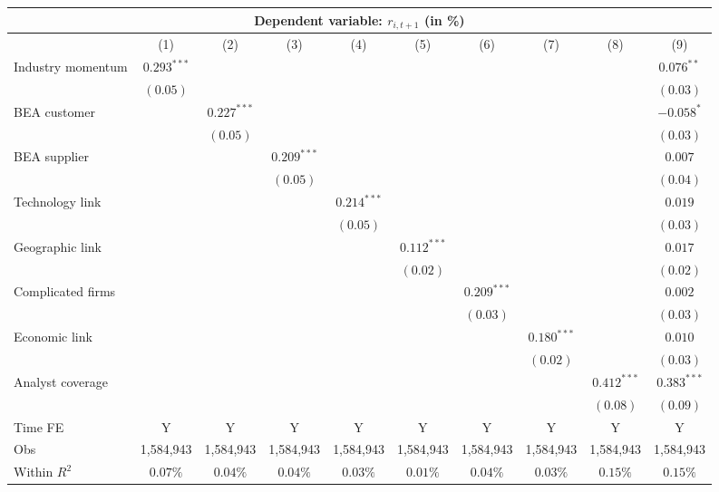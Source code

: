 \begin{tabular}{lccccccccc}
   \toprule
                        \multicolumn{10}{c}{Dependent variable: $r_{i,t+1}$ (in \%)} \\
 \hline \vspace{5pt} & (1) & (2) & (3) & (4) & (5) & (6) & (7) & (8) & (9) \\ 
  Industry momentum & $0.293^{***}$ &  &  &  &  &  &  &  & $0.076^{**}$ \\ 
   & $(0.05)$ &  &  &  &  &  &  &  & $(0.03)$ \\ 
  BEA customer &  & $0.227^{***}$ &  &  &  &  &  &  & $-0.058^{*}$ \\ 
   &  & $(0.05)$ &  &  &  &  &  &  & $(0.03)$ \\ 
  BEA supplier &  &  & $0.209^{***}$ &  &  &  &  &  & $0.007$ \\ 
   &  &  & $(0.05)$ &  &  &  &  &  & $(0.04)$ \\ 
  Technology link &  &  &  & $0.214^{***}$ &  &  &  &  & $0.019$ \\ 
   &  &  &  & $(0.05)$ &  &  &  &  & $(0.03)$ \\ 
  Geographic link &  &  &  &  & $0.112^{***}$ &  &  &  & $0.017$ \\ 
   &  &  &  &  & $(0.02)$ &  &  &  & $(0.02)$ \\ 
  Complicated firms &  &  &  &  &  & $0.209^{***}$ &  &  & $0.002$ \\ 
   &  &  &  &  &  & $(0.03)$ &  &  & $(0.03)$ \\ 
  Economic link &  &  &  &  &  &  & $0.180^{***}$ &  & $0.010$ \\ 
   &  &  &  &  &  &  & $(0.02)$ &  & $(0.03)$ \\ 
  Analyst coverage &  &  &  &  &  &  &  & $0.412^{***}$ & $0.383^{***}$ \\ 
   \vspace{5pt} &  &  &  &  &  &  &  & $(0.08)$ & $(0.09)$ \\ 
   \vspace{5pt}Time FE & Y & Y & Y & Y & Y & Y & Y & Y & Y \\ 
  Obs & 1,584,943 & 1,584,943 & 1,584,943 & 1,584,943 & 1,584,943 & 1,584,943 & 1,584,943 & 1,584,943 & 1,584,943 \\ 
  Within $R^2$ & $0.07\%$ & $0.04\%$ & $0.04\%$ & $0.03\%$ & $0.01\%$ & $0.04\%$ & $0.03\%$ & $0.15\%$ & $0.15\%$ \\ 
   \bottomrule 
\end{tabular}
